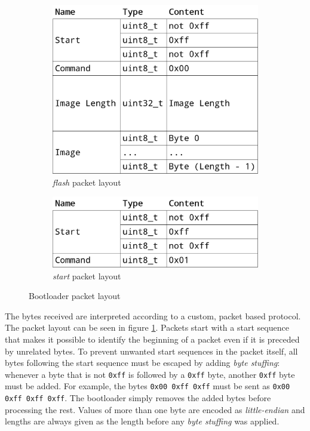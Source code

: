 \begin{figure}[h]
    \centering

    \begin{subfigure}[t]{0.5\textwidth}
        \centering
        \includegraphics[scale=0.18]{img/bootloader_flash_packet.png}
        \caption{\textit{flash} packet layout}
    \end{subfigure}%
    \begin{subfigure}[t]{0.5\textwidth}
        \centering
        \includegraphics[scale=0.18]{img/bootloader_start_packet.png}
        \caption{\textit{start} packet layout}
    \end{subfigure}

    \caption{Bootloader packet layout}
    \label{implementation/software/bootloader/packet-layout}
\end{figure}

The bytes received are interpreted according to a custom, packet based protocol. The packet layout
can be seen in figure \ref{implementation/software/bootloader/packet-layout}. Packets start with a
start sequence that makes it possible to identify the beginning of a packet even if it is preceded
by unrelated bytes. To prevent unwanted start sequences in the packet itself, all bytes following
the start sequence must be escaped by adding \textit{byte stuffing}: whenever a byte that is not
\lstinline{0xff} is followed by a \lstinline{0xff} byte, another \lstinline{0xff} byte must be added.
For example, the bytes \lstinline{0x00 0xff 0xff} must be sent as \lstinline{0x00 0xff 0xff 0xff}.
The bootloader simply removes the added bytes before processing the rest. Values of more than one
byte are encoded as \textit{little-endian} and lengths are always given as the length before any
\textit{byte stuffing} was applied.

